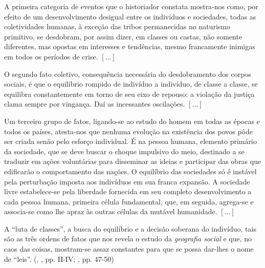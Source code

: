 \begin{citacao}
A primeira categoria de eventos que o historiador constata mostra-nos como, por efeito de um desenvolvimento desigual entre os indivíduos e sociedades, todas as coletividades humanas, à exceção das tribos permanecidas no naturismo primitivo, se desdobram, por assim dizer, em classes ou castas, não somente diferentes, mas opostas em interesses e tendências, mesmo francamente inimigas em todos os períodos de crise. \([\dots]\)

O segundo fato coletivo, consequência necessária do desdobramento dos corpos sociais, é que o equilíbrio rompido de indivíduo a indivíduo, de classe a classe, se equilibra constantemente em torno de seu eixo de repouso: a violação da justiça clama sempre por vingança. Daí as incessantes oscilações. \([\dots]\)

Um terceiro grupo de fatos, ligando-se ao estudo do homem em todas as épocas e todos os países, atesta-nos que nenhuma evolução na existência dos povos pôde ser criada senão pelo esforço individual. É na pessoa humana, elemento primário da sociedade, que se deve buscar o choque impulsivo do meio, destinado a se traduzir em ações voluntárias para disseminar as ideias e participar das obras que edificarão o comportamento das nações. O equilíbrio das sociedades só é instável pela perturbação imposta aos indivíduos em sua franca expansão. A sociedade livre estabelece-se pela liberdade fornecida em seu completo desenvolvimento a cada pessoa humana, primeira célula fundamental, que, em seguida, agrega-se e associa-se como lhe apraz às outras células da mutável humanidade. \([\dots]\)

A ``luta de classes'', a busca do equilíbrio e a decisão soberana do indivíduo, tais são as três ordens de fatos que nos revela o estudo da \textit{geografia social }e que, no caos das coisas, mostram-se assaz constantes para que se possa dar-lhes o nome de ``leis''. (\citeauthor{RECLUS1905a}, \citeyear{RECLUS1905a}, pp. II-IV; \citeyear{reclus_renovacao_2010}, pp. 47-50)
\end{citacao}

